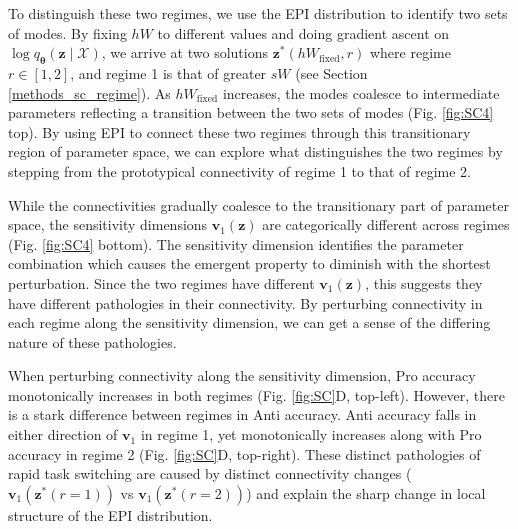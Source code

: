 \documentclass[11pt]{article}
\begin{document}
To distinguish these two regimes, we use the EPI distribution to identify two sets of modes.
By fixing $hW$ to different values and doing gradient ascent on $\log q_{\bm{\theta}}(\mathbf{z} \mid \mathcal{X})$, we arrive at two solutions $\mathbf{z}^*(hW_{\text{fixed}}, r)$ where regime $r \in [1,2]$, and regime 1 is that of greater $sW$ (see Section \ref{methods_sc_regime}).
As $hW_{\text{fixed}}$ increases, the modes coalesce to intermediate parameters reflecting a transition between the two sets of modes (Fig. \ref{fig:SC4} top).
By using EPI to connect these two regimes through this transitionary region of parameter space, we can explore what distinguishes the two regimes by stepping from the prototypical connectivity of regime 1 to that of regime 2.

While the connectivities gradually coalesce to the transitionary part of parameter space, the sensitivity dimensions $\mathbf{v}_1(\mathbf{z})$ are categorically different across regimes (Fig. \ref{fig:SC4} bottom).
The sensitivity dimension identifies the parameter combination which causes the emergent property to diminish with the shortest perturbation.
Since the two regimes have different $\mathbf{v}_1(\mathbf{z})$, this suggests they have different pathologies in their connectivity.
By perturbing connectivity in each regime along the sensitivity dimension, we can get a sense of the differing nature of these pathologies.

When perturbing connectivity along the sensitivity dimension, Pro accuracy monotonically increases in both regimes (Fig. \ref{fig:SC}D, top-left).
However, there is a stark difference between regimes in Anti accuracy. 
Anti accuracy falls in either direction of $\mathbf{v}_1$ in regime 1, yet monotonically increases along with Pro accuracy in regime 2 (Fig. \ref{fig:SC}D, top-right).
These distinct pathologies of rapid task switching are caused by distinct connectivity changes ($\mathbf{v}_1(\mathbf{z}^*(r=1))$ vs $\mathbf{v}_1(\mathbf{z}^*(r=2))$) and explain the sharp change in local structure of the EPI distribution.
\end{document}
